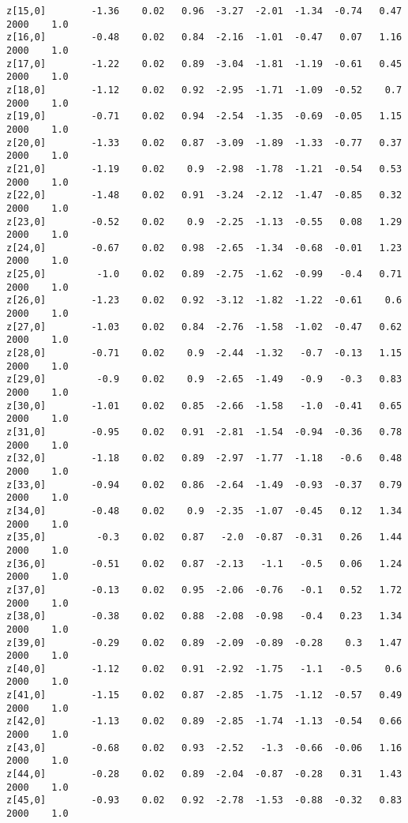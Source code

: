 \documentclass[11pt]{article}
\begin{document}
\begin{Verbatim}[commandchars=\\\{\}]
z[15,0]        -1.36    0.02   0.96  -3.27  -2.01  -1.34  -0.74   0.47   2000    1.0
z[16,0]        -0.48    0.02   0.84  -2.16  -1.01  -0.47   0.07   1.16   2000    1.0
z[17,0]        -1.22    0.02   0.89  -3.04  -1.81  -1.19  -0.61   0.45   2000    1.0
z[18,0]        -1.12    0.02   0.92  -2.95  -1.71  -1.09  -0.52    0.7   2000    1.0
z[19,0]        -0.71    0.02   0.94  -2.54  -1.35  -0.69  -0.05   1.15   2000    1.0
z[20,0]        -1.33    0.02   0.87  -3.09  -1.89  -1.33  -0.77   0.37   2000    1.0
z[21,0]        -1.19    0.02    0.9  -2.98  -1.78  -1.21  -0.54   0.53   2000    1.0
z[22,0]        -1.48    0.02   0.91  -3.24  -2.12  -1.47  -0.85   0.32   2000    1.0
z[23,0]        -0.52    0.02    0.9  -2.25  -1.13  -0.55   0.08   1.29   2000    1.0
z[24,0]        -0.67    0.02   0.98  -2.65  -1.34  -0.68  -0.01   1.23   2000    1.0
z[25,0]         -1.0    0.02   0.89  -2.75  -1.62  -0.99   -0.4   0.71   2000    1.0
z[26,0]        -1.23    0.02   0.92  -3.12  -1.82  -1.22  -0.61    0.6   2000    1.0
z[27,0]        -1.03    0.02   0.84  -2.76  -1.58  -1.02  -0.47   0.62   2000    1.0
z[28,0]        -0.71    0.02    0.9  -2.44  -1.32   -0.7  -0.13   1.15   2000    1.0
z[29,0]         -0.9    0.02    0.9  -2.65  -1.49   -0.9   -0.3   0.83   2000    1.0
z[30,0]        -1.01    0.02   0.85  -2.66  -1.58   -1.0  -0.41   0.65   2000    1.0
z[31,0]        -0.95    0.02   0.91  -2.81  -1.54  -0.94  -0.36   0.78   2000    1.0
z[32,0]        -1.18    0.02   0.89  -2.97  -1.77  -1.18   -0.6   0.48   2000    1.0
z[33,0]        -0.94    0.02   0.86  -2.64  -1.49  -0.93  -0.37   0.79   2000    1.0
z[34,0]        -0.48    0.02    0.9  -2.35  -1.07  -0.45   0.12   1.34   2000    1.0
z[35,0]         -0.3    0.02   0.87   -2.0  -0.87  -0.31   0.26   1.44   2000    1.0
z[36,0]        -0.51    0.02   0.87  -2.13   -1.1   -0.5   0.06   1.24   2000    1.0
z[37,0]        -0.13    0.02   0.95  -2.06  -0.76   -0.1   0.52   1.72   2000    1.0
z[38,0]        -0.38    0.02   0.88  -2.08  -0.98   -0.4   0.23   1.34   2000    1.0
z[39,0]        -0.29    0.02   0.89  -2.09  -0.89  -0.28    0.3   1.47   2000    1.0
z[40,0]        -1.12    0.02   0.91  -2.92  -1.75   -1.1   -0.5    0.6   2000    1.0
z[41,0]        -1.15    0.02   0.87  -2.85  -1.75  -1.12  -0.57   0.49   2000    1.0
z[42,0]        -1.13    0.02   0.89  -2.85  -1.74  -1.13  -0.54   0.66   2000    1.0
z[43,0]        -0.68    0.02   0.93  -2.52   -1.3  -0.66  -0.06   1.16   2000    1.0
z[44,0]        -0.28    0.02   0.89  -2.04  -0.87  -0.28   0.31   1.43   2000    1.0
z[45,0]        -0.93    0.02   0.92  -2.78  -1.53  -0.88  -0.32   0.83   2000    1.0

\end{Verbatim}
\end{document}
